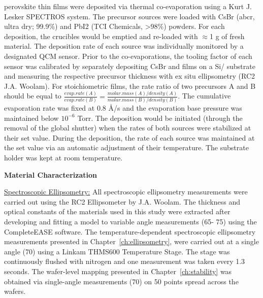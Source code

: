  perovskite thin films were deposited via thermal co-evaporation using a Kurt J. Lesker SPECTROS system. The precursor sources were loaded with CsBr (abcr, ultra dry; 99.9\%) and PbI2 (TCI Chemicals, >98\%) powders.
For each deposition, the crucibles would be emptied and re-loaded with $\approx$1 g of fresh material. The deposition rate of each source was individually monitored by a designated QCM sensor. Prior to the co-evaporations, the tooling factor of each sensor was calibrated by separately depositing CsBr and  films on a Si/ substrate and measuring the respective precursor thickness with ex situ ellipsometry (RC2 J.A. Woolam). For stoichiometric films, the rate ratio of two precursors A and B  should be equal to $\frac{evap. rate (A)}{evap.rate(B)}=\frac{molar.mass(A)/density(A)}{molar.mass(B)/density(B)}$. The cumulative evaporation rate was fixed at 0.8 \AA/s and the evaporation base pressure was maintained below $10^{-6}$ Torr. The deposition would be initiated (through the removal of the global shutter) when the rates of both sources were stabilized at their set value. During the deposition, the rate of each source was maintained at the set value via an automatic adjustment of their temperature. The substrate holder was kept at room temperature. 

\textbf{Material Characterization} 

\underline{Spectroscopic Ellipsometry:} All spectroscopic ellipsometry measurements were carried out using the RC2 Ellipsometer by J.A. Woolam. The thickness and optical constants of the materials used in this study were extracted after developing and fitting a model to variable angle measurements (65\degree - 75\degree) using the CompleteEASE software. The temperature-dependent spectroscopic ellipsometry measurements presented in Chapter~\ref{ch:ellipsometry}, were carried out at a single angle (70\degree) using a Linkam THMS600 Temperature Stage. The stage was continuously flushed with nitrogen and one measurement was taken every 1.3 seconds. The wafer-level mapping presented in Chapter~\ref{ch:stability} was obtained via single-angle measurements (70\degree) on 50 points spread across the wafers. 



